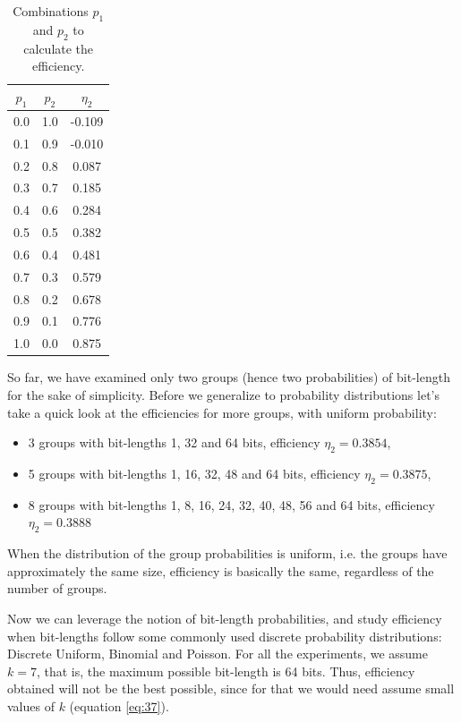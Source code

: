 \documentclass[10pt]{article}
\begin{document}
\begin{table}[h]
 \centering
 \caption{Combinations $p_1$ and $p_2$ to calculate the efficiency.}
 \begin{tabular}{ccc}
  \hline 
  $p_1$  & $p_2$ & $\eta_2$ \\
  \hline
  0.0	&1.0    &-0.109 \\
  0.1	&0.9	&-0.010 \\
  0.2	&0.8	&0.087 \\
  0.3	&0.7	&0.185 \\
  0.4	&0.6	&0.284 \\
  0.5	&0.5	&0.382 \\
  0.6	&0.4	&0.481 \\
  0.7	&0.3	&0.579 \\ 
  0.8	&0.2	&0.678 \\
  0.9	&0.1	&0.776 \\ 
  1.0	&0.0	&0.875 \\
  \hline
 \end{tabular}
 \label{tab:02}
\end{table}

So far, we have examined only two groups (hence two probabilities) of bit-length for the sake of simplicity. Before we generalize to probability distributions let's take a quick look at the efficiencies for more groups, with uniform probability:

\begin{itemize}
  \item 3 groups with bit-lengths 1, 32 and 64 bits, efficiency $\eta_2=0.3854$,
  \item 5 groups with bit-lengths 1, 16, 32, 48 and 64 bits, efficiency $\eta_2=0.3875$,
  \item 8 groups with bit-lengths 1, 8, 16, 24, 32, 40, 48, 56 and 64 bits, efficiency $\eta_2=0.3888$
\end{itemize}

When the distribution of the group probabilities is uniform, i.e. the groups have approximately the same size, efficiency is basically the same, regardless of the number of groups.

Now we can leverage the notion of bit-length probabilities, and study efficiency when bit-lengths follow some  commonly used discrete probability distributions: Discrete Uniform, Binomial and Poisson. For all the experiments, we assume $k=7$, that is, the maximum possible bit-length is 64 bits. Thus, efficiency obtained will not be the best possible, since for that we would need assume small values of $k$ (equation \ref{eq:37}). 
\end{document}
